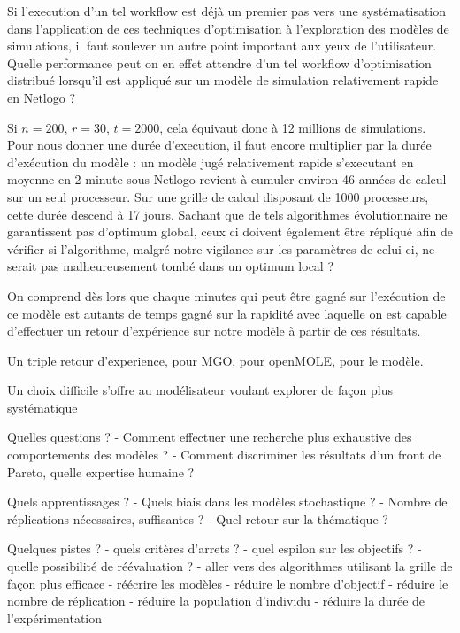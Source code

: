 Si l'execution d'un tel workflow est déjà un premier pas vers une systématisation dans l'application de ces techniques d'optimisation à l'exploration des modèles de simulations, il faut soulever un autre point important aux yeux de l'utilisateur. Quelle performance peut on en effet attendre d'un tel workflow d'optimisation distribué lorsqu'il est appliqué sur un modèle de simulation relativement rapide en Netlogo ?

Si $n=200$, $r = 30$, $t=2000$, cela équivaut donc à 12 millions de simulations. Pour nous donner une durée d'execution, il faut encore multiplier par la durée d'exécution du modèle : un modèle jugé relativement rapide s'executant en moyenne en 2 minute sous Netlogo revient à cumuler environ 46 années de calcul sur un seul processeur. Sur une grille de calcul disposant de 1000 processeurs, cette durée descend à 17 jours. Sachant que de tels algorithmes évolutionnaire ne garantissent pas d'optimum global, ceux ci doivent également être répliqué afin de vérifier si l'algorithme, malgré notre vigilance sur les paramètres de celui-ci, ne serait pas malheureusement tombé dans un optimum local ?

On comprend dès lors que chaque minutes qui peut être gagné sur l'exécution de ce modèle est autants de temps gagné sur la rapidité avec laquelle on est capable d'effectuer un retour d'expérience sur notre modèle à partir de ces résultats.


Un triple retour d'experience, pour MGO, pour openMOLE, pour le modèle.

Un choix difficile s'offre au modélisateur voulant explorer de façon plus systématique

Quelles questions ?
- Comment effectuer une recherche plus exhaustive des comportements des modèles ?
- Comment discriminer les résultats d'un front de Pareto, quelle expertise humaine ?

Quels apprentissages ?
- Quels biais dans les modèles stochastique ?
- Nombre de réplications nécessaires, suffisantes ?
- Quel retour sur la thématique ?

Quelques pistes ?
- quels critères d'arrets ?
- quel espilon sur les objectifs ?
- quelle possibilité de réévaluation ?
- aller vers des algorithmes utilisant la grille de façon plus efficace
- réécrire les modèles
- réduire le nombre d'objectif
- réduire le nombre de réplication
- réduire la population d'individu
- réduire la durée de l'expérimentation
